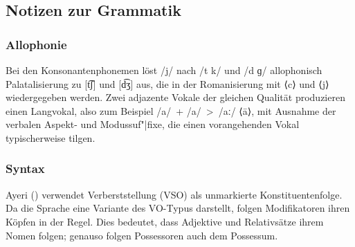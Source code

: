\documentclass[
	12pt,
	ngerman,
]{scrartcl}
\let\q\textquote
\newcommand{\zwsp}{\mbox{​}} %
\newcommand{\ayr}[1]{\zwsp\smash{{\Tagati #1}}} %
\newcommand{\xayr}[3]{\zwsp\smash{\Tagati #1} \emph{#2} `#3'} %
\begin{document}
\subsection{Notizen zur Grammatik}
\label{subsec:gramnot}

\subsubsection{Allophonie}

Bei den Konsonantenphonemen löst /j/ nach /t k/ und /d ɡ/ allophonisch
Palatalisierung zu [t͡ʃ] und [d͡ʒ] aus, die in der Romanisierung mit ⟨c⟩ und
⟨j⟩ wiedergegeben werden.
Zwei adjazente Vokale der gleichen Qualität produzieren einen Langvokal, also
zum Beispiel /a/~+ /a/~>~/aː/ ⟨ā⟩, mit Ausnahme der verbalen Aspekt- und
Modussuf"|fixe, die einen vorangehenden Vokal typischerweise tilgen.

\subsubsection{Syntax}

Ayeri (\mbox{\ayr{Ayeri}}) verwendet Verberststellung (VSO) als unmarkierte
Konstituentenfolge. Da die Sprache eine Variante des VO-Typus darstellt, folgen
Modifikatoren ihren Köpfen in der Regel. Dies bedeutet, dass Adjektive und
Relativsätze ihrem Nomen folgen; genauso folgen Possessoren auch dem Possessum.

\end{document}
